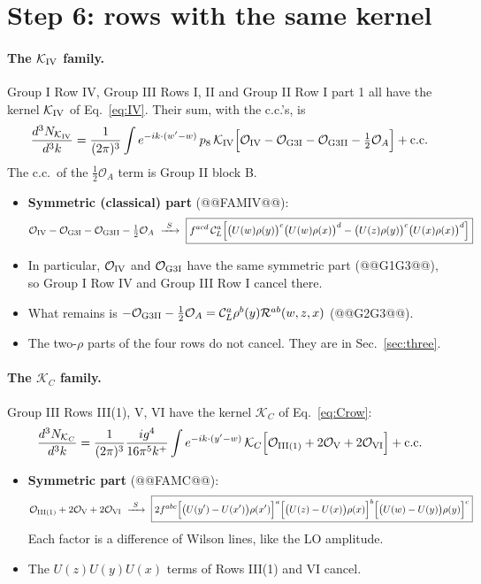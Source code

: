 \documentclass[10pt]{article}
\numberwithin{equation}{section}
\newcommand{\CL}{\mathcal C_L}
\newcommand{\Rc}{\mathcal R}
\newcommand{\OO}{\mathcal O}
\newcommand{\KK}{\mathcal K}
\newcommand{\pre}{\frac{1}{(2\pi)^3}}
\newcommand{\phw}{e^{-ik\cdot(w'-w)}}
\begin{document}
\section{Step 6: rows with the same kernel}\label{sec:families}
\paragraph{The $\KK_{\rm IV}$ family.} Group I Row IV, Group III Rows I, II and Group II Row I part 1 all have the kernel $\KK_{\rm IV}$ of Eq.~\eqref{eq:IV}. Their sum, with the c.c.'s, is
\begin{equation}
\frac{d^3N_{\KK_{\rm IV}}}{d^3k}=\pre\int\phw\,p_8\,\KK_{\rm IV}\Big[\OO_{\rm IV}-\OO_{\rm G3I}-\OO_{\rm G3II}-\tfrac12\OO_A\Big]+{\rm c.c.}
\label{eq:famIV}
\end{equation}
The c.c.\ of the $\frac12\OO_A$ term is Group II block B.
\begin{itemize}
\item \textbf{Symmetric (classical) part} (@@FAMIV@@):
\begin{equation}
\OO_{\rm IV}-\OO_{\rm G3I}-\OO_{\rm G3II}-\tfrac12\OO_A\ \xrightarrow{\ S\ }\ \boxed{f^{acd}\,\CL^a\Big[\big(U(w)\rho(y)\big)^c\big(U(w)\rho(x)\big)^d-\big(U(z)\rho(y)\big)^c\big(U(x)\rho(x)\big)^d\Big]}
\label{eq:famIVs}
\end{equation}
\item In particular, $\OO_{\rm IV}$ and $\OO_{\rm G3I}$ have the same symmetric part (@@G1G3@@), so Group I Row IV and Group III Row I cancel there.
\item What remains is $-\OO_{\rm G3II}-\frac12\OO_A=\CL^a\rho^b(y)\Rc^{ab}(w,z,x)$ (@@G2G3@@).
\item The two-$\rho$ parts of the four rows do not cancel. They are in Sec.~\ref{sec:three}.
\end{itemize}

\paragraph{The $\KK_C$ family.} Group III Rows III(1), V, VI have the kernel $\KK_C$ of Eq.~\eqref{eq:Crow}:
\begin{equation}
\frac{d^3N_{\KK_C}}{d^3k}=\pre\frac{ig^4}{16\pi^5k^+}\int e^{-ik\cdot(y'-w)}\,\KK_C\Big[\OO_{\rm III(1)}+2\OO_{\rm V}+2\OO_{\rm VI}\Big]+{\rm c.c.}
\label{eq:famC}
\end{equation}
\begin{itemize}
\item \textbf{Symmetric part} (@@FAMC@@):
\begin{equation}
\OO_{\rm III(1)}+2\OO_{\rm V}+2\OO_{\rm VI}\ \xrightarrow{\ S\ }\ \boxed{2f^{abc}\Big[\big(U(y')-U(x')\big)\rho(x')\Big]^a\Big[\big(U(z)-U(x)\big)\rho(x)\Big]^b\Big[\big(U(w)-U(y)\big)\rho(y)\Big]^c}
\label{eq:famCs}
\end{equation}
Each factor is a difference of Wilson lines, like the LO amplitude.
\item The $U(z)U(y)U(x)$ terms of Rows III(1) and VI cancel.
\end{itemize}
\end{document}

